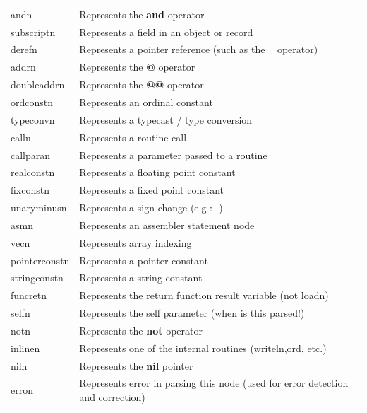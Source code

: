 \documentclass [a4paper,12pt]{article}
\begin{document}
\begin{longtable}{|l|p{10cm}|}
\textsf{andn}&
		\textsf{Represents the }\textsf{\textbf{and}}\textsf{ operator} \\
\textsf{subscriptn}&
		\textsf{Represents a field in an object or record} \\
\textsf{derefn}&
		\textsf{Represents a pointer reference (such as the }\textsf{\textbf{\ }}\textsf{ operator)} \\
\textsf{addrn}&
		\textsf{Represents the }\textsf{\textbf{@}}\textsf{ operator} \\
\textsf{doubleaddrn}&
		\textsf{Represents the }\textsf{\textbf{@@}}\textsf{ operator} \\
\textsf{ordconstn}&
		\textsf{Represents an ordinal constant} \\
\textsf{typeconvn}&
		\textsf{Represents a typecast / type conversion} \\
\textsf{calln}&
		\textsf{Represents a routine call} \\
\textsf{callparan}&
		\textsf{Represents a parameter passed to a routine} \\
\textsf{realconstn}&
		\textsf{Represents a floating point constant} \\
\textsf{fixconstn}&
		\textsf{Represents a fixed point constant} \\
\textsf{unaryminusn}&
		\textsf{Represents a sign change (e.g : -)} \\
\textsf{asmn}&
		\textsf{Represents an assembler statement node} \\
\textsf{vecn}&
		\textsf{Represents array indexing} \\
\textsf{pointerconstn}&
		\textsf{Represents a pointer constant} \\
\textsf{stringconstn}&
		\textsf{Represents a string constant} \\
\textsf{funcretn}&
		\textsf{Represents the return function result variable (not loadn)} \\
\textsf{selfn}&
		\textsf{Represents the self parameter (when is this parsed!)} \\
\textsf{notn}&
		\textsf{Represents the }\textsf{\textbf{not}}\textsf{ operator} \\
\textsf{inlinen}&
		\textsf{Represents one of the internal routines (writeln,ord, etc.)} \\
\textsf{niln}&
		\textsf{Represents the }\textsf{\textbf{nil}}\textsf{ pointer } \\
\textsf{erron}&
		\textsf{Represents error in parsing this node (used for error detection and correction)} \\

\end{longtable}
\end{document}
